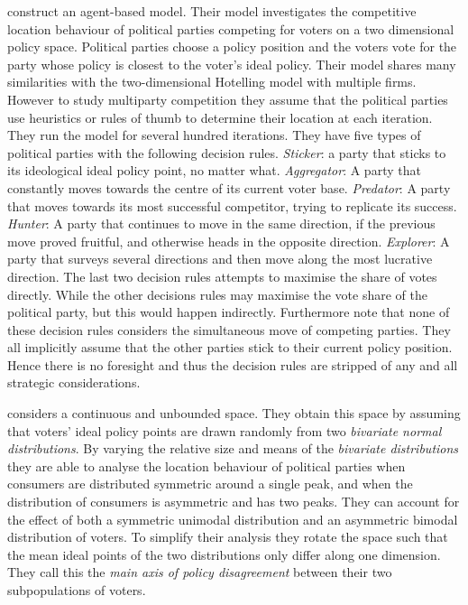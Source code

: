 \documentclass[preprint, 12pt]{elsarticle}
\begin{document}
\citet{Laver_Sergenti_2011} construct an agent-based model. Their model investigates the competitive location behaviour of political parties competing for voters on a two dimensional policy space. Political parties choose a policy position and the voters vote for the party whose policy is closest to the voter's ideal policy. Their model shares many similarities with the two-dimensional Hotelling model with multiple firms. However to study multiparty competition they assume that the political parties use heuristics or rules of thumb to determine their location at each iteration. They run the model for several hundred iterations. They have five types of political parties with the following decision rules. \emph{Sticker}: a party that sticks to its ideological ideal policy point, no matter what. \emph{Aggregator}: A party that constantly moves towards the centre of its current voter base. \emph{Predator}: A party that moves towards its most successful competitor, trying to replicate its success. \emph{Hunter}: A party that continues to move in the same direction, if the previous move proved fruitful, and otherwise heads in the opposite direction. \emph{Explorer}: A party that surveys several directions and then move along the most lucrative direction. The last two decision rules attempts to maximise the share of votes directly. While the other decisions rules may maximise the vote share of the political party, but this would happen indirectly. Furthermore note that none of these decision rules considers the simultaneous move of competing parties. They all implicitly assume that the other parties stick to their current policy position. Hence there is no foresight and thus the decision rules are stripped of any and all strategic considerations.

\citet{Laver_Sergenti_2011} considers a continuous and unbounded space. They obtain this space by assuming that voters' ideal policy points are drawn randomly from two \emph{bivariate normal distributions}. By varying the relative size and means of the \emph{bivariate distributions} they are able to analyse the location behaviour of political parties when consumers are distributed symmetric around a single peak, and when the distribution of consumers is asymmetric and has two peaks. They can account for the effect of both a symmetric unimodal distribution and an asymmetric bimodal distribution of voters. To simplify their analysis they rotate the space such that the mean ideal points of the two distributions only differ along one dimension. They call this the \emph{main axis of policy disagreement} between their two subpopulations of voters.
\end{document}
